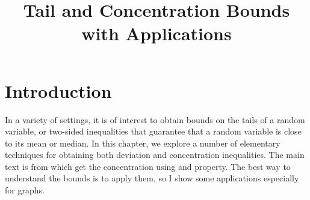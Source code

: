 \documentclass{article}
\title{Tail and Concentration Bounds with Applications}
\begin{document}
\maketitle


\section{Introduction}
In a variety of settings, it is of interest to obtain bounds on the tails of a random variable, or two-sided inequalities that guarantee that a random variable is close to its mean or median. In this chapter, we explore a number of elementary techniques for obtaining both deviation and concentration inequalities. The main text is from \cite{wainwright2019high,mcdiarmid1989method} which get the concentration using  and  property. The best way to understand the bounds is to apply them, so I show some applications especially for graphs.
\end{document}
